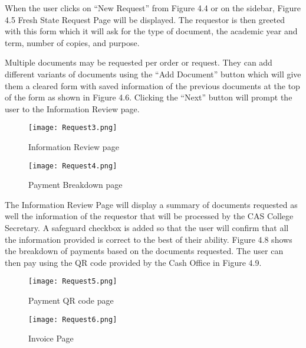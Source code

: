 When the user clicks on “New Request” from Figure 4.4 or on the sidebar, Figure 4.5 Fresh State Request Page will be displayed. The requestor is then greeted with this form which it will ask for the type of document, the academic year and term, number of copies, and purpose. 

Multiple documents may be requested per order or request. They can add different variants of documents using the “Add Document” button which will give them a cleared form with saved information of the previous documents at the top of the form as shown in Figure 4.6. Clicking the “Next” button will prompt the user to the Information Review page.

    \begin{figure}[h]
        \centering 
        \begin{minipage}[c]{0.5\linewidth}
            \centering
            \texttt{[image: Request3.png]}
            \caption{Information Review page}
            \label{fig:Request3}
        \end{minipage}\hfill
        \begin{minipage}[c]{0.5\linewidth}
            \centering
            \texttt{[image: Request4.png]}
            \caption{Payment Breakdown page}
            \label{fig:Request4}
        \end{minipage}
    \end{figure}

The Information Review Page will display a summary of documents requested as well the information of the requestor that will be processed by the CAS College Secretary. A safeguard checkbox is added so that the user will confirm that all the information provided is correct to the best of their ability. Figure 4.8 shows the breakdown of payments based on the documents requested. The user can then pay using the QR code provided by the Cash Office in Figure 4.9.

    \begin{figure}[h]
        \centering 
        \begin{minipage}[c]{0.5\linewidth}
            \centering
            \texttt{[image: Request5.png]}
            \caption{Payment QR code page}
            \label{fig:Request5}
        \end{minipage}\hfill
        \begin{minipage}[c]{0.5\linewidth}
            \centering
            \texttt{[image: Request6.png]}
            \caption{Invoice Page}
            \label{fig:Request6}
        \end{minipage}
    \end{figure}

